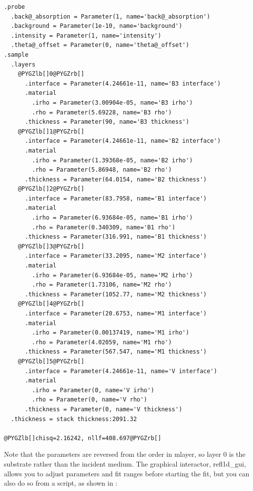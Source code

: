 \documentclass[letterpaper,10pt,english]{sphinxmanual}
\begin{document}
\begin{Verbatim}[commandchars=@\[\]]
.probe
  .back@_absorption = Parameter(1, name='back@_absorption')
  .background = Parameter(1e-10, name='background')
  .intensity = Parameter(1, name='intensity')
  .theta@_offset = Parameter(0, name='theta@_offset')
.sample
  .layers
    @PYGZlb[]0@PYGZrb[]
      .interface = Parameter(4.24661e-11, name='B3 interface')
      .material
        .irho = Parameter(3.00904e-05, name='B3 irho')
        .rho = Parameter(5.69228, name='B3 rho')
      .thickness = Parameter(90, name='B3 thickness')
    @PYGZlb[]1@PYGZrb[]
      .interface = Parameter(4.24661e-11, name='B2 interface')
      .material
        .irho = Parameter(1.39368e-05, name='B2 irho')
        .rho = Parameter(5.86948, name='B2 rho')
      .thickness = Parameter(64.0154, name='B2 thickness')
    @PYGZlb[]2@PYGZrb[]
      .interface = Parameter(83.7958, name='B1 interface')
      .material
        .irho = Parameter(6.93684e-05, name='B1 irho')
        .rho = Parameter(0.340309, name='B1 rho')
      .thickness = Parameter(316.991, name='B1 thickness')
    @PYGZlb[]3@PYGZrb[]
      .interface = Parameter(33.2095, name='M2 interface')
      .material
        .irho = Parameter(6.93684e-05, name='M2 irho')
        .rho = Parameter(1.73106, name='M2 rho')
      .thickness = Parameter(1052.77, name='M2 thickness')
    @PYGZlb[]4@PYGZrb[]
      .interface = Parameter(20.6753, name='M1 interface')
      .material
        .irho = Parameter(0.00137419, name='M1 irho')
        .rho = Parameter(4.02059, name='M1 rho')
      .thickness = Parameter(567.547, name='M1 thickness')
    @PYGZlb[]5@PYGZrb[]
      .interface = Parameter(4.24661e-11, name='V interface')
      .material
        .irho = Parameter(0, name='V irho')
        .rho = Parameter(0, name='V rho')
      .thickness = Parameter(0, name='V thickness')
  .thickness = stack thickness:2091.32

@PYGZlb[]chisq=2.16242, nllf=408.697@PYGZrb[]
\end{Verbatim}

Note that the parameters are reversed from the order in mlayer, so layer 0
is the substrate rather than the incident medium.  The graphical interactor,
refl1d\_gui, allows you to adjust parameters and fit ranges before starting
the fit, but you can also do so from a script, as shown in
:
\end{document}
